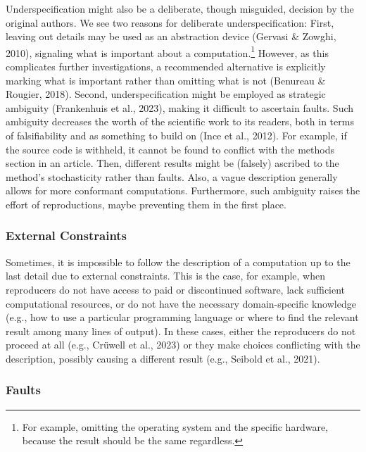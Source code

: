 \documentclass[authordate, empirical]{jote-new-article}
\begin{document}
	Underspecification might also be a deliberate, though misguided, decision by the original authors. We see two reasons for deliberate underspecification: First, leaving out details may be used as an abstraction device (Gervasi \& Zowghi, 2010), signaling what is important about a computation.\footnote{ For example, omitting the operating system and the specific hardware, because the result should be the same regardless.} However, as this complicates further investigations, a recommended alternative is explicitly marking what is important rather than omitting what is not (Benureau \& Rougier, 2018). Second, underspecification might be employed as strategic ambiguity (Frankenhuis et al., 2023), making it difficult to ascertain faults. Such ambiguity decreases the worth of the scientific work to its readers, both in terms of falsifiability and as something to build on (Ince et al., 2012). For example, if the source code is withheld, it cannot be found to conflict with the methods section in an article. Then, different results might be (falsely) ascribed to the method's stochasticity rather than faults. Also, a vague description generally allows for more conformant computations. Furthermore, such ambiguity raises the effort of reproductions, maybe preventing them in the first place.



	\subsubsection{External Constraints}



	Sometimes, it is impossible to follow the description of a computation up to the last detail due to external constraints. This is the case, for example, when reproducers do not have access to paid or discontinued software, lack sufficient computational resources, or do not have the necessary domain-specific knowledge (e.g., how to use a particular programming language or where to find the relevant result among many lines of output). In these cases, either the reproducers do not proceed at all (e.g., Crüwell et al., 2023) or they make choices conflicting with the description, possibly causing a different result (e.g., Seibold et al., 2021).



	\subsubsection{Faults}
\end{document}

